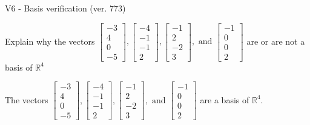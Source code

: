 \begin{exercise}
  \begin{exerciseTitle}V6 - Basis verification (ver. 773)\end{exerciseTitle}
  \begin{exerciseStatement}
    Explain why the vectors \(\left[\begin{array}{r}
-3 \\
4 \\
0 \\
-5
\end{array}\right] , \left[\begin{array}{r}
-4 \\
-1 \\
-1 \\
2
\end{array}\right] , \left[\begin{array}{r}
-1 \\
2 \\
-2 \\
3
\end{array}\right] , \text{ and } \left[\begin{array}{r}
-1 \\
0 \\
0 \\
2
\end{array}\right]\) are or are not a basis of \(\mathbb{R}^4\)	


  \end{exerciseStatement}
  \begin{exerciseAnswer}
   The vectors \(\left[\begin{array}{r}
-3 \\
4 \\
0 \\
-5
\end{array}\right] , \left[\begin{array}{r}
-4 \\
-1 \\
-1 \\
2
\end{array}\right] , \left[\begin{array}{r}
-1 \\
2 \\
-2 \\
3
\end{array}\right] , \text{ and } \left[\begin{array}{r}
-1 \\
0 \\
0 \\
2
\end{array}\right]\) 
  	 are  a basis of \(\mathbb{R}^4\).
  


  \end{exerciseAnswer}
\end{exercise}